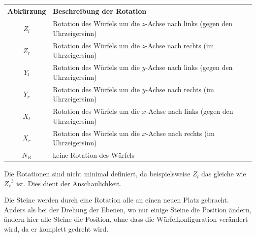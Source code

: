 \documentclass[12pt,a4paper, usenames, dvipsnames]{article}
\theoremstyle{mystyle}
\theoremstyle{definition}
\begin{document}
\begin{tabular}{cl}
\toprule
\textbf{Abkürzung} & \textbf{Beschreibung der Rotation} \\
\midrule
$Z_l$ & Rotation des Würfels um die $z$-Achse nach links (gegen den Uhrzeigersinn)\\

$Z_r$ & Rotation des Würfels um die $z$-Achse nach rechts (im Uhrzeigersinn)  \\

$Y_l$ & Rotation des Würfels um die $y$-Achse nach links (gegen den Uhrzeigersinn)\\

$Y_r$ & Rotation des Würfels um die $y$-Achse nach rechts (im Uhrzeigersinn)  \\

$X_l$ & Rotation des Würfels um die $x$-Achse nach links (gegen den Uhrzeigersinn)\\

$X_r$ & Rotation des Würfels um die $x$-Achse nach rechts (im Uhrzeigersinn) \\

$N_R$ & keine Rotation des Würfels \\
\bottomrule
\end{tabular} 


Die Rotationen sind nicht minimal definiert, da beispielsweise $Z_l$ das gleiche wie ${Z_r}^3$ ist. Dies dient der Anschaulichkeit. 

Die Steine werden durch eine Rotation alle an einen neuen Platz gebracht. Anders als bei der Drehung der Ebenen, wo nur einige Steine die Position ändern, ändern hier alle Steine die Position, ohne dass die Würfelkonfiguration verändert wird, da er komplett gedreht wird. 
\end{document}
